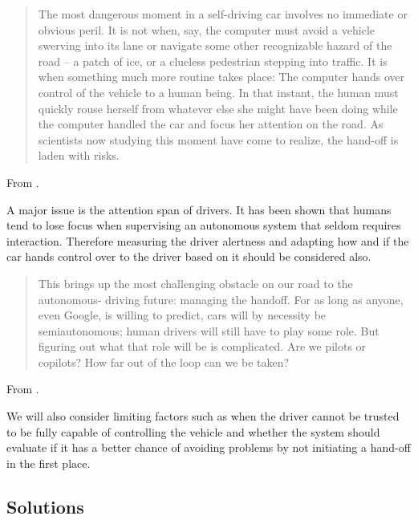 \documentclass{acm_proc_article-sp}
\begin{document}
\begin{quote}
The most dangerous moment in a self-driving car involves no immediate or obvious peril.
It is not when, say, the computer must avoid a vehicle swerving into its lane or navigate some other recognizable hazard of the road -- a patch of ice, or a clueless pedestrian stepping into traffic.
It is when something much more routine takes place: The computer hands over control of the vehicle to a human being.
In that instant, the human must quickly rouse herself from whatever else she might have been doing while the computer handled the car and focus her attention on the road.
As scientists now studying this moment have come to realize, the hand-off is laden with risks.
\end{quote}
From \cite{www:huffington_post}.

A major issue is the attention span of drivers.
It has been shown that humans tend to lose focus when supervising an autonomous system that seldom requires interaction.
Therefore measuring the driver alertness and adapting how and if the car hands control over to the driver based on it should be considered also.

\begin{quote}
This brings up the most challenging obstacle on our road to the autonomous- driving future: managing the handoff.
For as long as anyone, even Google, is willing to predict, cars will by necessity be semiautonomous; human drivers will still have to play some role.
But figuring out what that role will be is complicated.
Are we pilots or copilots? How far out of the loop can we be taken?
\end{quote}
From \cite{www:wired}.

We will also consider limiting factors such as when the driver cannot be trusted to be fully capable of controlling the vehicle and whether the system should evaluate if it has a better chance of avoiding problems by not initiating a hand-off in the first place.

\subsection{Solutions}
\label{solutions}
\end{document}
